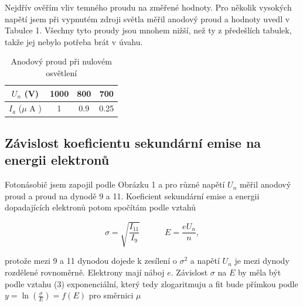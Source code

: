 \documentclass[a4paper,11pt]{article}
\begin{document}
Nejdřív ověřím vliv temného proudu na změřené hodnoty. Pro několik vysokých napětí jsem při vypnutém zdroji světla měřil anodový proud a hodnoty uvedl v Tabulce 1. Všechny tyto proudy jsou mnohem nižší, než ty z předešlích tabulek, takže jej nebylo potřeba brát v úvahu.

\begin{table}[htpb]
    \centering
    \begin{tabular}{  c | c c c }
        $ U_n $ (V) & 1000 & 800 & 700 \\
        \hline
        $ I_a $ ($ \mu $ A ) & 1 & 0.9 & 0.25 \\
    \end{tabular} 
    \caption{Anodový proud při nulovém osvětlení}
\end{table}


\subsection{Závislost koeficientu sekundární emise na energii elektronů}

Fotonásobič jsem zapojil podle Obrázku 1 a pro různé napětí $ U_n $ měřil anodový proud a proud na dynodě 9 a 11. Koeficient sekundární emise a energii dopadajících elektronů potom spočítám podle vztahů

\begin{equation}
\sigma = \sqrt{\frac{I_{11}}{I_{9}}} \quad \quad  \quad E = \frac{e U_n}{n},
\end{equation}

\noindent
protože mezi 9 a 11 dynodou dojede k zesílení o $ \sigma^{2} $ a napětí $ U_n $  je mezi dynody rozdělené rovnoměrně. Elektrony mají náboj $ e $. Závislost $ \sigma $ na $ E $ by měla být podle vztahu (3) exponenciální, který tedy zlogaritmuju a fit bude přímkou podle $ y = \ln (\frac{\sigma}{E}) = f(E) $ pro směrnici $ \mu $ 
\end{document}
